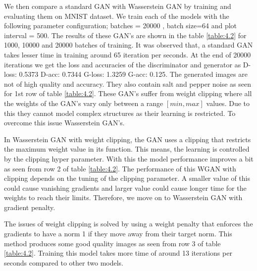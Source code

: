 We then compare a standard GAN with Wasserstein GAN by training and evaluating them on MNIST dataset. We train each of the models with the following parameter configuration; batches = 20000 , batch size=64 and plot interval = 500. The results of these GAN's are shown in the table \ref{table:4.2} for 1000, 10000 and 20000 batches of training. It was observed that, a standard GAN takes lesser time in training around 65 iteration per seconds. At the end of 20000 iterations we get  the loss and accuracies of the discriminator and generator as D-loss: 0.5373 D-acc: 0.7344 G-loss: 1.3259 G-acc: 0.125. The generated images are not of high quality and accuracy. They also contain salt and pepper noise as seen for 1st row of table \ref{table:4.2}. These GAN's suffer from weight clipping where all the weights of the GAN's vary only between a range $[min,max]$ values. Due to this they cannot model complex structures as their learning is restricted. To overcome this issue Wasserstein GAN's.

In Wasserstein GAN with weight clipping, the GAN uses a clipping that restricts the maximum weight value in its function. This means, the learning is controlled by the clipping hyper parameter. With this the model performance improves a bit as seen from row 2 of table \ref{table:4.2}. The performance of this WGAN with clipping depends on the tuning of the clipping parameter. A smaller value of this could cause vanishing gradients and larger value could cause longer time for the weights to reach their limits. Therefore, we move on to Wasserstein GAN with gradient penalty.

The issues of weight clipping is solved by using a weight penalty that enforces the gradients to have a norm 1 if they move away from their target norm. This method produces some good quality images as seen from row 3 of table \ref{table:4.2}. Training this model takes more time of around 13 iterations per seconds compared to other two models. 


